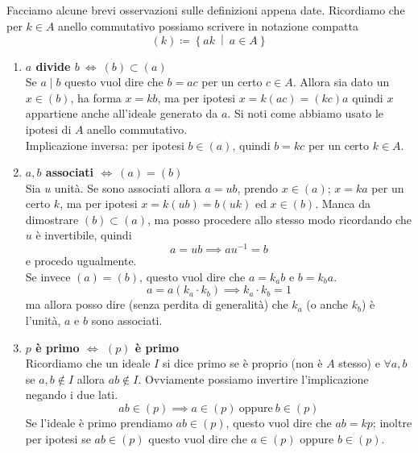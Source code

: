 \begin{osservazione} 
	Facciamo alcune brevi osservazioni sulle definizioni appena date. Ricordiamo che per $k \in A$ anello commutativo possiamo scrivere in notazione compatta 
	\begin{equation*}
	(k) \coloneqq \left\{ak \ \middle| \ a \in A\right\}
	\end{equation*}
	\begin{enumerate}
		\item \textbf{$a$ divide $ b \ \iff \ (b) \subset (a)$}\\
		Se $a\mid b$ questo vuol dire che $b=ac$ per un certo $c \in A$. Allora sia dato un $x \in (b)$, ha forma $x=kb$, ma per ipotesi $x=k(ac)=(kc)a$ quindi $x$ appartiene anche all'ideale generato da $a$. Si noti come abbiamo usato le ipotesi di $A$ anello commutativo.\\
		Implicazione inversa: per ipotesi $b \in (a)$, quindi $b=kc$ per un certo $k \in A$.
		\item \textbf{$a,b$ associati $\iff \ (a)=(b)$}\\
		Sia $u$ unità. Se sono associati allora $a=ub$, prendo $x \in (a)$; $x=ka$ per un certo $k$, ma per ipotesi $x=k(ub)=b(uk)$ ed $x \in (b)$. Manca da dimostrare $(b) \subset (a)$, ma posso procedere allo stesso modo ricordando che $u$ è invertibile, quindi 
		\begin{equation*}
		a=ub \implies au^{-1}=b
		\end{equation*}
		e procedo ugualmente. \\ 
		Se invece $(a)=(b)$, questo vuol dire che $a=k_ab$ e $b=k_ba$. 
		\begin{equation*}
		a=a(k_a\cdot k_b) \implies k_a\cdot k_b=1 
		\end{equation*}
 		ma allora posso dire (senza perdita di generalità) che $k_a$ (o anche $k_b$) è l'unità, $a$ e $b$ sono associati.
		\item \textbf{$p$ è primo $\iff$ $(p)$ è primo}\\
		Ricordiamo che un ideale $I$ si dice primo se è proprio (non è $A$ stesso) e $\forall a,b$ se $a,b\notin I$ allora $ab \notin I$. Ovviamente possiamo invertire l'implicazione negando i due lati. 
		\begin{equation*}
		ab \in (p) \implies a \in (p) \ \text{oppure} \ b \in (p)
		\end{equation*}
		Se l'ideale è primo prendiamo $ab \in (p)$, questo vuol dire che $ab=kp$; inoltre per ipotesi se $ab\in(p)$ questo vuol dire che $a\in(p)$ oppure $b\in(p)$.

\end{enumerate}
\end{osservazione}
